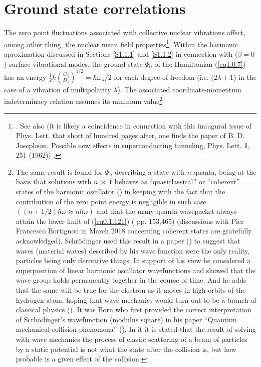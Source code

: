 \section{Ground state correlations}\label{S1.8}
The zero point fluctuations associated with collective nuclear vibrations affect, among other thing, the nuclear mean field properties\footnote{\cite{Gogny:78,Esbensen:83,Reinhard:79,Khodel:82,Barranco:87a,Barranco:85}. See also \cite{Brown:63,Anderson:62} (it is likely a coincidence in connection with this inaugural issue of Phys. Lett. that short of hundred pages after, one finds the paper of B. D. Josephson, Possible new effects in superconducting tunneling, Phys. Lett. \textbf{1}, 251 (1962)) .}. Within the harmonic aproximation discussed in Sections \ref{S1.1.1} and \ref{S1.1.2} in connection with ($\beta=0$) surface vibrational modes, the ground state $\Psi_0$ of the Hamiltonian (\ref{eq1.0.7}) has an energy $\frac{1}{2}\hbar\left(\frac{C_\lambda}{D_\lambda}\right)^{1/2}=\hbar\omega_\lambda/2$ for each degree of freedom (i.e. ($2\lambda+1$) in the case of a vibration of multipolarity $\lambda$). The associated coordinate-momentum indeterminacy relation assumes its minimum value\footnote{The same result is found for $\Psi_n$ describing a state with $n$-quanta, being at the basis that solutions with $n\gg1$ behaves as ``quasiclassical'' or ``coherent'' states of the harmonic oscillator (\cite{Glauber:07}) in keeping with the fact that the contribution of the zero point energy is negligible in such case $((n+1/2)\hbar\omega\approx n\hbar\omega)$ and that the many quanta wavepacket always attain the lower limit of (\ref{eq0.1.121}) (\cite{Basdevant:05} pp. 153,465) (discussions with Pier Francesco Bortignon in March 2018 concerning coherent states are gratefully acknowledged). Schr\"odinger used this result  in a paper (\cite{Schrodinger:26}) to suggest that waves (material waves) described by his wave function were the only reality, particles being only derivative things. In support of his view he considered a superposition of linear harmonic oscillator wavefunctions and showed that the wave group holds permanently together in the course of time. And he adds that the same will be true for the electron as it moves in high orbits of the hydrogen atom, hoping that wave mechanics would turn out to be a branch of classical physics (\cite{Pais:00}). It was Born who first provided the correct interpretation of Scrh\"odinger's wavefunction (modulus square) in his paper ``Quantum mechanical collision phenomena'' (\cite{Born:26}). In it it is stated that the result of solving with wave mechanics the process of elastic scattering of a beam of particles by a static potential is not what the state after the collision is, but how probable is a given effect of the collision.}
